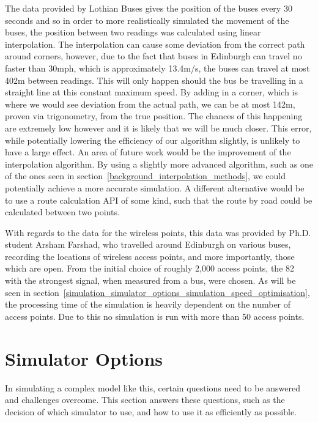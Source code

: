     The data provided by Lothian Buses gives the position of the buses every 30 seconds and so in order to more realistically simulated the movement of the buses, the position between two readings was calculated using linear interpolation. The interpolation can cause some deviation from the correct path around corners, however, due to the fact that buses in Edinburgh can travel no faster than 30mph, which is approximately 13.4m/s, the buses can travel at most 402m between readings. This will only happen should the bus be travelling in a straight line at this constant maximum speed. By adding in a corner, which is where we would see deviation from the actual path, we can be at most 142m, proven via trigonometry, from the true position. The chances of this happening are extremely low however and it is likely that we will be much closer. This error, while potentially lowering the efficiency of our algorithm slightly, is unlikely to have a large effect. An area of future work would be the improvement of the interpolation algorithm. By using a slightly more advanced algorithm, such as one of the ones seen in section~\ref{background_interpolation_methods}, we could potentially achieve a more accurate simulation. A different alternative would be to use a route calculation API of some kind, such that the route by road could be calculated between two points. 

    With regards to the data for the wireless points, this data was provided by Ph.D. student Arsham Farshad, who travelled around Edinburgh on various buses, recording the locations of wireless access points, and more importantly, those which are open. From the initial choice of roughly 2,000 access points, the 82 with the strongest signal, when measured from a bus, were chosen. As will be seen in section~\ref{simulation_simulator_options_simulation_speed_optimisation}, the processing time of the simulation is heavily dependent on the number of access points. Due to this no simulation is run with more than 50 access points. 

    \section{Simulator Options}\label{simulation_simulator_options}

        In simulating a complex model like this, certain questions need to be answered and challenges overcome. This section answers these questions, such as the decision of which simulator to use, and how to use it as efficiently as possible. 

